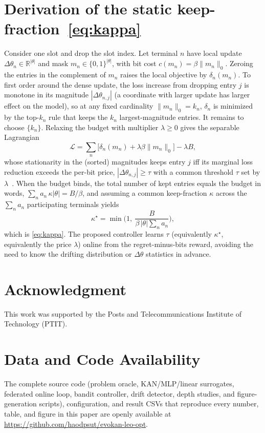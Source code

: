 \documentclass[journal]{IEEEtran}
\begin{document}
\section{Derivation of the static keep-fraction~\eqref{eq:kappa}}\label{app:kappa}
Consider one slot and drop the slot index. Let terminal $n$ have local update
$\Delta\theta_n\in\mathbb R^{|\theta|}$ and mask $m_n\in\{0,1\}^{|\theta|}$, with bit
cost $c(m_n)=\beta\|m_n\|_0$. Zeroing the entries in the complement of $m_n$ raises
the local objective by $\delta_n(m_n)$. To first order around the dense update, the
loss increase from dropping entry $j$ is monotone in its magnitude $|\Delta\theta_{n,j}|$
(a coordinate with larger update has larger effect on the model), so at any fixed
cardinality $\|m_n\|_0=k_n$, $\delta_n$ is minimized by the top-$k_n$ rule that
keeps the $k_n$ largest-magnitude entries. It remains to choose $\{k_n\}$. Relaxing
the budget with multiplier $\lambda\ge0$ gives the separable Lagrangian
\begin{equation}
\mathcal L=\sum_n\Big[\delta_n(m_n)+\lambda\beta\|m_n\|_0\Big]-\lambda B,
\end{equation}
whose stationarity in the (sorted) magnitudes keeps entry $j$ iff its marginal loss
reduction exceeds the per-bit price, $|\Delta\theta_{n,j}|\ge\tau$ with a common
threshold $\tau$ set by $\lambda$~\cite{boyd2004convex}. When the budget binds, the
total number of kept entries equals the budget in words, $\sum_n a_n\,\kappa|\theta|=B/\beta$,
and assuming a common keep-fraction $\kappa$ across the $\sum_n a_n$ participating
terminals yields
\begin{equation}
\kappa^\star=\min\!\Big(1,\ \frac{B}{\beta\,|\theta|\sum_n a_n}\Big),
\end{equation}
which is \eqref{eq:kappa}. The proposed controller learns $\tau$ (equivalently
$\kappa^\star$, equivalently the price $\lambda$) online from the regret-minus-bits
reward, avoiding the need to know the drifting distribution or $\Delta\theta$
statistics in advance.

\section*{Acknowledgment}
This work was supported by the Posts and Telecommunications Institute of Technology
(PTIT).

\section*{Data and Code Availability}
The complete source code (problem oracle, KAN/MLP/linear surrogates, federated
online loop, bandit controller, drift detector, depth studies, and figure-generation
scripts), configuration, and result CSVs that reproduce every number, table, and
figure in this paper are openly available at
\url{https://github.com/haodpsut/evokan-leo-opt}.
\end{document}
